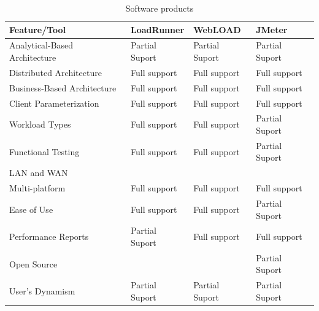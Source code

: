 \documentclass[espaco=umemeio,chapter=TITLE,twoside,openright]{abnt}
\begin{document}
\begin{table}[h]
\centering
\caption{Software products}
\label{tab: tabtool2}
\begin{tabular}{|l|l|l|l|}
\hline
\rowcolor[HTML]{EFEFEF}
\textbf{Feature/Tool}         & \textbf{LoadRunner} & \textbf{WebLOAD} & \textbf{JMeter} \\ \hline
\cellcolor[HTML]{EFEFEF}Analytical-Based Architecture & Partial Suport      & Partial Suport   & Partial Suport  \\ \hline
\cellcolor[HTML]{EFEFEF}Distributed Architecture      & Full support        & Full support     & Full support    \\ \hline
\cellcolor[HTML]{EFEFEF}Business-Based Architecture   & Full support        & Full support     & Full support    \\ \hline
\cellcolor[HTML]{EFEFEF}Client Parameterization       & Full support        & Full support     & Full support    \\ \hline
\cellcolor[HTML]{EFEFEF}Workload Types                & Full support        & Full support     & Partial Suport  \\ \hline
\cellcolor[HTML]{EFEFEF}Functional Testing            & Full support        & Full support     & Partial Suport  \\ \hline
\cellcolor[HTML]{EFEFEF}LAN and WAN                   &                     &                  &                 \\ \hline
\cellcolor[HTML]{EFEFEF}Multi-platform                & Full support        & Full support     & Full support    \\ \hline
\cellcolor[HTML]{EFEFEF}Ease of Use                   & Full support        & Full support     & Partial Suport  \\ \hline
\cellcolor[HTML]{EFEFEF}Performance Reports           & Partial Suport      & Full support     & Full support    \\ \hline
\cellcolor[HTML]{EFEFEF}Open Source                   &                     &                  & Partial Suport  \\ \hline
\cellcolor[HTML]{EFEFEF}User’s Dynamism               & Partial Suport      & Partial Suport   & Partial Suport  \\ \hline
\end{tabular}
\end{table}
\end{document}

